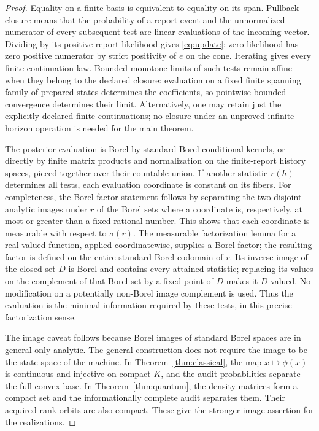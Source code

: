 \begin{proof}
Equality on a finite basis is equivalent to equality on its span. Pullback closure means that the probability of a report event and the unnormalized numerator of every subsequent test are linear evaluations of the incoming vector. Dividing by its positive report likelihood gives \eqref{eq:update}; zero likelihood has zero positive numerator by strict positivity of $e$ on the cone. Iterating gives every finite continuation law. Bounded monotone limits of such tests remain affine when they belong to the declared closure: evaluation on a fixed finite spanning family of prepared states determines the coefficients, so pointwise bounded convergence determines their limit. Alternatively, one may retain just the explicitly declared finite continuations; no closure under an unproved infinite-horizon operation is needed for the main theorem.

The posterior evaluation is Borel by standard Borel conditional kernels, or directly by finite matrix products and normalization on the finite-report history spaces, pieced together over their countable union. If another statistic $r(h)$ determines all tests, each evaluation coordinate is constant on its fibers. For completeness, the Borel factor statement follows by separating the two disjoint analytic images under $r$ of the Borel sets where a coordinate is, respectively, at most or greater than a fixed rational number. This shows that each coordinate is measurable with respect to $\sigma(r)$. The measurable factorization lemma for a real-valued function, applied coordinatewise, supplies a Borel factor; the resulting factor is defined on the entire standard Borel codomain of $r$. Its inverse image of the closed set $D$ is Borel and contains every attained statistic; replacing its values on the complement of that Borel set by a fixed point of $D$ makes it $D$-valued. No modification on a potentially non-Borel image complement is used. Thus the evaluation is the minimal information required by these tests, in this precise factorization sense.

The image caveat follows because Borel images of standard Borel spaces are in general only analytic. The general construction does not require the image to be the state space of the machine. In Theorem~\ref{thm:classical}, the map $x\mapsto\phi(x)$ is continuous and injective on compact $K$, and the audit probabilities separate the full convex base. In Theorem~\ref{thm:quantum}, the density matrices form a compact set and the informationally complete audit separates them. Their acquired rank orbits are also compact. These give the stronger image assertion for the realizations.
\end{proof}

